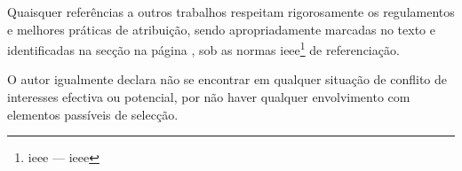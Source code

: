     Quaisquer referências a outros trabalhos respeitam rigorosamente os regulamentos e melhores práticas de
    atribuição, sendo apropriadamente marcadas no texto e identificadas na secção \emph{} na página \pageref{chapter:refs}, sob as normas \acrshort{ieee}\footnote{\acrshort{ieee} --- \acrlong{ieee}} de referenciação.
    
    O autor igualmente declara não se encontrar em qualquer situação de conflito de interesses efectiva ou potencial, por não haver qualquer envolvimento com elementos passíveis de selecção.
    
    
